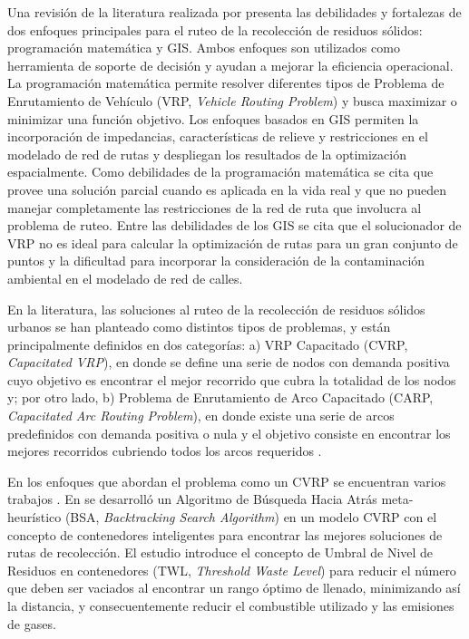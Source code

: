 \documentclass[spanish, conference]{IEEEtran}
\begin{document}
Una revisión de la literatura realizada por \cite{Sulemana2018OptimalMethods} presenta las debilidades y fortalezas de dos enfoques principales para el ruteo de la recolección de residuos sólidos: programación matemática y GIS. Ambos enfoques son utilizados como herramienta de soporte de decisión y ayudan a mejorar la eficiencia operacional. La programación matemática permite resolver diferentes tipos de Problema de Enrutamiento de Vehículo (VRP, \textit{Vehicle Routing Problem}) y busca maximizar o minimizar una función objetivo. Los enfoques basados en GIS permiten la incorporación de impedancias, características de relieve y restricciones en el modelado de red de rutas y despliegan los resultados de la optimización espacialmente. Como debilidades de la programación matemática se cita que provee una solución parcial cuando es aplicada en la vida real y que no pueden manejar completamente las restricciones de la red de ruta que involucra al problema de ruteo. Entre las debilidades de los GIS se cita que el solucionador de VRP no es ideal para calcular la optimización de rutas para un gran conjunto de puntos y la dificultad para incorporar la consideración de la contaminación ambiental en el modelado de red de calles.

En la literatura, las soluciones al ruteo de la recolección de residuos sólidos urbanos se han planteado como distintos tipos de problemas, y están principalmente definidos en dos categorías: a) VRP Capacitado (CVRP, \textit{Capacitated VRP}), en donde se define una serie de nodos con demanda positiva cuyo objetivo es encontrar el mejor recorrido que cubra la totalidad de los nodos y; por otro lado, b) Problema de Enrutamiento de Arco Capacitado (CARP, \textit{Capacitated Arc Routing Problem}), en donde existe una serie de arcos predefinidos con demanda positiva o nula y el objetivo consiste en encontrar los mejores recorridos cubriendo todos los arcos requeridos \cite{Tirkolaee2018ATime}.

En los enfoques que abordan el problema como un CVRP se encuentran varios trabajos \cite{Akhtar2017BacktrackingOptimization,Ombuki-Berman2007WASTEALGORITHMS,Kim2006WasteWindows,Billa2014GISOptimization,Karadimas2007OptimalAlgorithm}. En \cite{Akhtar2017BacktrackingOptimization} se desarrolló un Algoritmo de Búsqueda Hacia Atrás meta-heurístico (BSA, \textit{Backtracking Search Algorithm}) en un modelo CVRP con el concepto de contenedores inteligentes para encontrar las mejores soluciones de rutas de recolección. El estudio introduce el concepto de Umbral de Nivel de Residuos en contenedores (TWL, \textit{Threshold Waste Level}) para reducir el número que deben ser vaciados al encontrar un rango óptimo de llenado, minimizando así la distancia, y consecuentemente reducir el combustible utilizado y las emisiones de gases.
\end{document}
